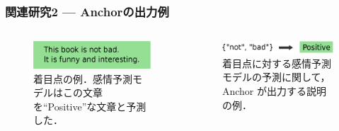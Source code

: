 \documentclass[aspectratio=169]{slide-ja}
\begin{document}
\begin{frame}
  \frametitle{関連研究2 — Anchorの出力例}
  \begin{columns}[]
    \begin{column}{0.35\textwidth}
      \begin{figure}
        \centering
        \includegraphics[width=\textwidth]{example-instance}
        \caption{%
          着目点の例．感情予測モデルはこの文章を``Positive''な文章と予測した．
        }
      \end{figure}
    \end{column}
    \begin{column}{0.4\textwidth}
      \vspace{0.7em}
      \begin{figure}
        \includegraphics[width=\textwidth]{example-anchor}
        \vspace{-0.5em}
        \caption{%
          着目点に対する感情予測モデルの予測に関して，
          Anchor が出力する説明の例．
        }
      \end{figure}
    \end{column}
  \end{columns}
\end{frame}
\end{document}
